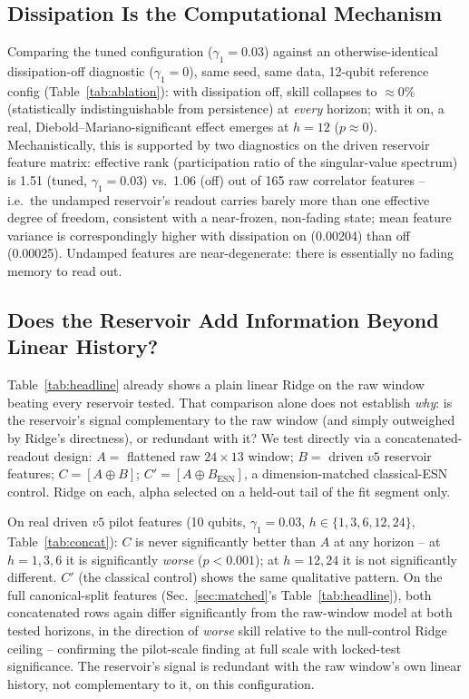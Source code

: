 \documentclass[11pt,twocolumn]{article}
\begin{document}
\subsection{Dissipation Is the Computational Mechanism}
\label{sec:results-mechanism}

Comparing the tuned configuration ($\gamma_1{=}0.03$) against an otherwise-identical
dissipation-off diagnostic ($\gamma_1{=}0$), same seed, same data, 12-qubit reference config
(Table~\ref{tab:ablation}): with dissipation off, skill collapses to $\approx0\%$ (statistically
indistinguishable from persistence) at \emph{every} horizon; with it on, a real,
Diebold--Mariano-significant effect emerges at $h{=}12$ ($p{\approx}0$). Mechanistically, this is
supported by two diagnostics on the driven reservoir feature matrix: effective rank
(participation ratio of the singular-value spectrum) is 1.51 (tuned, $\gamma_1{=}0.03$) vs.\ 1.06
(off) out of 165 raw correlator features -- i.e.\ the undamped reservoir's readout carries barely
more than one effective degree of freedom, consistent with a near-frozen, non-fading state; mean
feature variance is correspondingly higher with dissipation on (0.00204) than off (0.00025).
Undamped features are near-degenerate: there is essentially no fading memory to read out.



\subsection{Does the Reservoir Add Information Beyond Linear History?}
\label{sec:concat}

Table~\ref{tab:headline} already shows a plain linear Ridge on the raw window beating every
reservoir tested. That comparison alone does not establish \emph{why}: is the reservoir's signal
complementary to the raw window (and simply outweighed by Ridge's directness), or redundant with
it? We test directly via a concatenated-readout design: $A{=}$ flattened raw $24\times13$ window;
$B{=}$ driven $v5$ reservoir features; $C{=}[A{\oplus}B]$; $C'{=}[A{\oplus}B_{\text{ESN}}]$, a
dimension-matched classical-ESN control. Ridge on each, alpha selected on a held-out tail of the
fit segment only.

On real driven $v5$ pilot features (10 qubits, $\gamma_1{=}0.03$, $h\in\{1,3,6,12,24\}$,
Table~\ref{tab:concat}): $C$ is never significantly better than $A$ at any horizon -- at $h{=}1,3,6$
it is significantly \emph{worse} ($p{<}0.001$); at $h{=}12,24$ it is not significantly different.
$C'$ (the classical control) shows the same qualitative pattern. On the full canonical-split
features (Sec.~\ref{sec:matched}'s Table~\ref{tab:headline}), both concatenated rows again differ
significantly from the raw-window model at both tested horizons, in the direction of \emph{worse}
skill relative to the null-control Ridge ceiling -- confirming the pilot-scale finding at full
scale with locked-test significance. The reservoir's signal is redundant with the raw window's own
linear history, not complementary to it, on this configuration.
\end{document}
